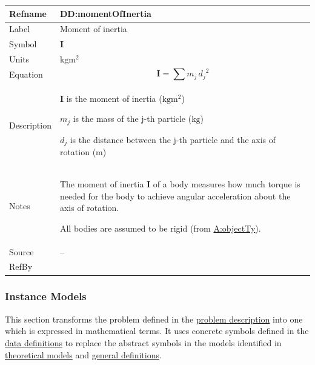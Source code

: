\documentclass[12pt]{article}
\begin{document}
\medskip
\noindent
\begin{minipage}{\textwidth}
\begin{tabular}{>{\raggedright}p{}>{\raggedright\arraybackslash}p{}}
\toprule \textbf{Refname} & \textbf{DD:momentOfInertia}
\label{DD:momentOfInertia}
\\ \midrule
Label & Moment of inertia
        
\\ \midrule
Symbol & $\symbf{I}$
         
\\ \midrule
Units & $\text{kg}\text{m}^{2}$
        
\\ \midrule
Equation & \begin{displaymath}
           \symbf{I}=\displaystyle\sum{{m_{j}}\,{d_{j}}^{2}}
           \end{displaymath}
\\ \midrule
Description & \begin{symbDescription}
              \item{$\symbf{I}$ is the moment of inertia ($\text{kg}\text{m}^{2}$)}
              \item{${m_{j}}$ is the mass of the j-th particle (${\text{kg}}$)}
              \item{${d_{j}}$ is the distance between the j-th particle and the axis of rotation (${\text{m}}$)}
              \end{symbDescription}
\\ \midrule
Notes & The moment of inertia $\symbf{I}$ of a body measures how much torque is needed for the body to achieve angular acceleration about the axis of rotation.
        
        All bodies are assumed to be rigid (from \hyperref[assumpOT]{A:objectTy}).
        
\\ \midrule
Source & --
         
\\ \midrule
RefBy & 
\\ \bottomrule
\end{tabular}
\end{minipage}

\subsubsection{Instance Models}
\label{Sec:IMs}
This section transforms the problem defined in the \hyperref[Sec:ProbDesc]{problem description} into one which is expressed in mathematical terms. It uses concrete symbols defined in the \hyperref[Sec:DDs]{data definitions} to replace the abstract symbols in the models identified in \hyperref[Sec:TMs]{theoretical models} and \hyperref[Sec:GDs]{general definitions}.
\end{document}
